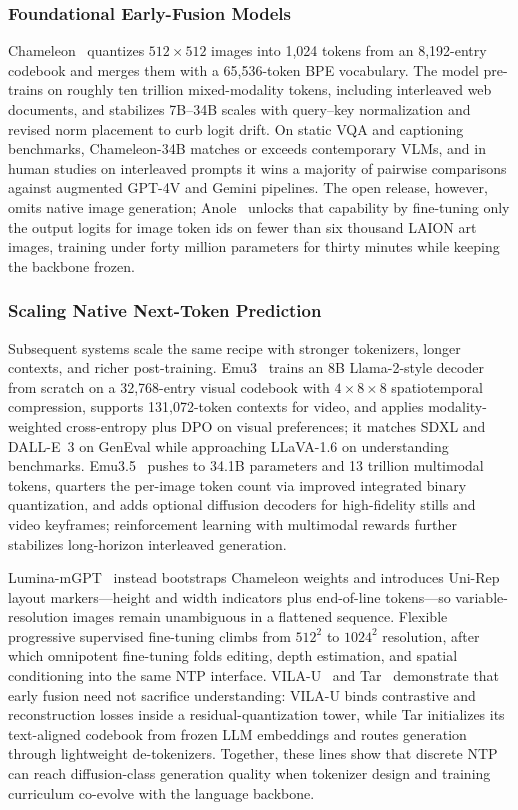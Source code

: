 \subsubsection{Foundational Early-Fusion Models}
\label{subsubsec:chameleon-line}

Chameleon~\cite{team2024chameleon} quantizes $512\times512$ images into 1,024 tokens from an 8,192-entry codebook and merges them with a 65,536-token BPE vocabulary. The model pre-trains on roughly ten trillion mixed-modality tokens, including interleaved web documents, and stabilizes 7B--34B scales with query--key normalization and revised norm placement to curb logit drift. On static VQA and captioning benchmarks, Chameleon-34B matches or exceeds contemporary VLMs, and in human studies on interleaved prompts it wins a majority of pairwise comparisons against augmented GPT-4V and Gemini pipelines. The open release, however, omits native image generation; Anole~\cite{chern2024anole} unlocks that capability by fine-tuning only the output logits for image token ids on fewer than six thousand LAION art images, training under forty million parameters for thirty minutes while keeping the backbone frozen.

\subsubsection{Scaling Native Next-Token Prediction}
\label{subsubsec:ntp-scale}

Subsequent systems scale the same recipe with stronger tokenizers, longer contexts, and richer post-training. Emu3~\cite{wang2024emu3} trains an 8B Llama-2-style decoder from scratch on a 32,768-entry visual codebook with $4\times8\times8$ spatiotemporal compression, supports 131,072-token contexts for video, and applies modality-weighted cross-entropy plus DPO on visual preferences; it matches SDXL and DALL-E~3 on GenEval while approaching LLaVA-1.6 on understanding benchmarks. Emu3.5~\cite{cui2025emu3} pushes to 34.1B parameters and 13 trillion multimodal tokens, quarters the per-image token count via improved integrated binary quantization, and adds optional diffusion decoders for high-fidelity stills and video keyframes; reinforcement learning with multimodal rewards further stabilizes long-horizon interleaved generation.

Lumina-mGPT~\cite{liu2024lumina} instead bootstraps Chameleon weights and introduces Uni-Rep layout markers---height and width indicators plus end-of-line tokens---so variable-resolution images remain unambiguous in a flattened sequence. Flexible progressive supervised fine-tuning climbs from $512^2$ to $1024^2$ resolution, after which omnipotent fine-tuning folds editing, depth estimation, and spatial conditioning into the same NTP interface. VILA-U~\cite{wu2025vila} and Tar~\cite{han2026vision} demonstrate that early fusion need not sacrifice understanding: VILA-U binds contrastive and reconstruction losses inside a residual-quantization tower, while Tar initializes its text-aligned codebook from frozen LLM embeddings and routes generation through lightweight de-tokenizers. Together, these lines show that discrete NTP can reach diffusion-class generation quality when tokenizer design and training curriculum co-evolve with the language backbone.

